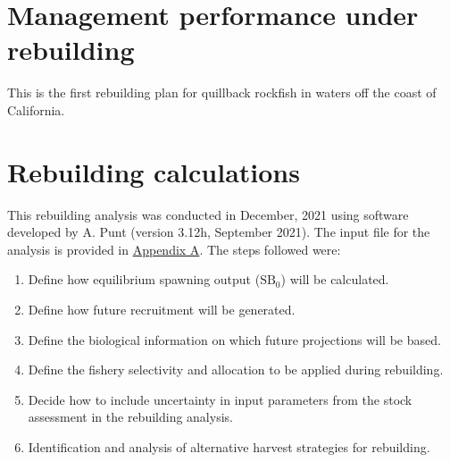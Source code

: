 \documentclass[11pt,
  english,
  letterpaper,
]{article}
\begin{document}
\leavevmode\tagmcend\tagstructend\par


\hypertarget{management-performance-under-rebuilding}{%
\section{Management performance under rebuilding}\label{management-performance-under-rebuilding}}

\leavevmode\tagmcend\tagstructend


This is the first rebuilding plan for quillback rockfish in waters off the coast of California.

\leavevmode\tagmcend\tagstructend\par


\hypertarget{rebuilding-calculations}{%
\section{Rebuilding calculations}\label{rebuilding-calculations}}

\leavevmode\tagmcend\tagstructend


This rebuilding analysis was conducted in December, 2021 using software developed by A. Punt (version 3.12h, September 2021). The input file for the analysis is provided in {\protect\hyperlink{append_a}{Appendix A}\leavevmode\tagmcend\tagstructend}. The steps followed were:

\leavevmode\tagmcend\tagstructend\par

\begin{enumerate}
    \item Define how equilibrium spawning output ($\text{SB}_0$) will be calculated. 
    \item Define how future recruitment will be generated.
    \item Define the biological information on which future projections will be based.
    \item Define the fishery selectivity and allocation to be applied during rebuilding. 
    \item Decide how to include uncertainty in input parameters from the stock assessment in the rebuilding analysis. 
    \item Identification and analysis of alternative harvest strategies for rebuilding. 
\end{enumerate}
\end{document}
